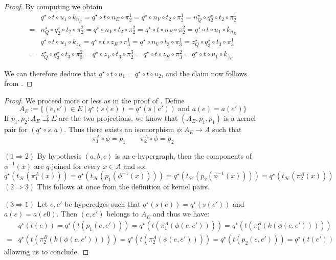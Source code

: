 \documentclass[3p]{elsarticle}
\theoremstyle{remark}
\theoremstyle{definition}
\begin{document}
\begin{proof}
			
		 	By computing we obtain
\vspace{-.3cm}
	\begin{align*}
		&q^\star \circ t \circ u_1 \circ k_{n_E} = q^\star \circ t \circ n_E \circ \pi_2^1 =q^\star \circ n_V\circ t_2\circ \pi^1_2=
		 n_Q^\star \circ q_2^\star \circ t_2 \circ \pi_2^1 \\= &n_Q^\star \circ q_2^\star \circ t_2 \circ \pi_2^2 =q^\star \circ n_V\circ t_2\circ \pi^2_2= q^\star \circ t \circ n_E \circ \pi_2^2 = q^\star \circ t \circ u_1 \circ k_{n_E}\\
		 &q^\star \circ t \circ u_1 \circ k_{z_E} = q^\star \circ t \circ z_E \circ \pi_3^1 =q^\star \circ n_V\circ t_3\circ \pi^1_3=
		 z_Q^\star \circ q_3^\star \circ t_3 \circ \pi_3^1 \\= &z_Q^\star \circ q_3^\star \circ t_3 \circ \pi_3^2 =q^\star \circ z_V\circ t_3\circ \pi^3_2= q^\star \circ t \circ z_E \circ \pi_3^2 = q^\star \circ t \circ u_1 \circ k_{z_E}
	\end{align*}
	
	We can therefore deduce that $q^\star \circ t \circ u_1 = q^\star \circ t \circ u_2$, and the claim now follows from .
\end{proof}

\fh*
\begin{proof}\label{proof:fh} We proceed more or less as in the proof of . Define
	\[A_E:=\{(e,e')\in E \mid q^\star(s(e))=q^\star(s(e')) \text{ and } a(e)=a(e')\}\] 
	If $p_1, p_2\colon A_E\rightrightarrows E$ are the two projections, we know that $(A_E, p_1, p_1)$ is a kernel pair for $(q^\star \circ s, a)$. Thus there exists an isomorphism $\phi \colon A_E\to A$ such that 
	\[\pi^A_1\circ \phi =p_1 \qquad \pi^A_2\circ \phi = p_2\]
	
	\smallskip \noindent
	$(1\Rightarrow 2)$ By hypothesis $(a,b,c)$ is an e-hypergraph, then the components of $\phi^{-1}(x)$ are $q$-joined for every $x\in A$ and so:
	\[q^\star(t_{\mathcal{H}}(\pi^A_1(x)))=q^\star(t_{\mathcal{H}}(p_1(\phi^{-1}(x))))=q^\star(t_{\mathcal{H}}(p_2(\phi^{-1}(x))))=q^\star(t_{\mathcal{H}}(\pi^A_2(x)))\]
	\smallskip \noindent $(2\Rightarrow 3)$ This follows at once from the definition of kernel pairs.
	
	\smallskip \noindent $(3\Rightarrow 1)$ Let $e, e'$ be hyperedges such that $q^\star(s(e))=q^\star(s(e'))$ and $a(e)=a(e0)$. Then $(e,e')$ belongs to $A_E$ and thus we have:
	\begin{align*}
		&q^\star(t(e))=q^\star(t(p_1(e, e')))=q^\star(t(\pi^A_1(\phi(e,e'))))=q^\star(t(\pi^B_1(k(\phi(e,e')))))\\=&q^\star(t(\pi^B_2(k(\phi(e,e')))))=q^\star(t(\pi^A_2(\phi(e,e'))))=q^\star(t(p_2(e, e')))=q^\star(t(e'))
	\end{align*}
allowing us to conclude. \qedhere 
\end{proof}
\end{document}
